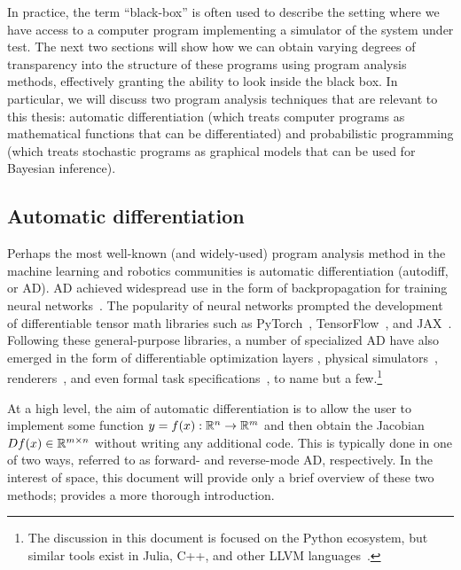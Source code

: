 In practice, the term ``black-box'' is often used to describe the setting where we have access to a computer program implementing a simulator of the system under test. The next two sections will show how we can obtain varying degrees of transparency into the structure of these programs using program analysis methods, effectively granting the ability to look inside the black box. In particular, we will discuss two program analysis techniques that are relevant to this thesis: automatic differentiation (which treats computer programs as mathematical functions that can be differentiated) and probabilistic programming (which treats stochastic programs as graphical models that can be used for Bayesian inference).

\subsection{Automatic differentiation}

Perhaps the most well-known (and widely-used) program analysis method in the machine learning and robotics communities is automatic differentiation (autodiff, or AD). AD achieved widespread use in the form of backpropagation for training neural networks~\cite{rumelhartLearningRepresentationsBackpropagating1986}. The popularity of neural networks prompted the development of differentiable tensor math libraries such as PyTorch~\cite{pytorch}, TensorFlow~\cite{tensorflow2015-whitepaper}, and JAX~\cite{jax2018github}. Following these general-purpose libraries, a number of specialized AD have also emerged in the form of differentiable optimization layers \cite{agrawalDifferentiableConvexOptimization2019}, physical simulators~\cite{huDiffTaichiDifferentiableProgramming2019}, renderers~\cite{huDiffTaichiDifferentiableProgramming2019,lelidecDifferentiableRenderingPerturbed2021}, and even formal task specifications~\cite{leungBackPropagationSignalTemporal2021}, to name but a few.\footnote{The discussion in this document is focused on the Python ecosystem, but similar tools exist in Julia, C++, and other LLVM languages~\cite{NEURIPS2020_9332c513}.}

At a high level, the aim of automatic differentiation is to allow the user to implement some function $y = f(x): \mathbb{R}^n \rightarrow \mathbb{R}^m$ and then obtain the Jacobian $Df(x) \in \mathbb{R}^{m\times n}$ without writing any additional code. This is typically done in one of two ways, referred to as forward- and reverse-mode AD, respectively. In the interest of space, this document will provide only a brief overview of these two methods; \cite{AutodiffCookbookJAX} provides a more thorough introduction.


